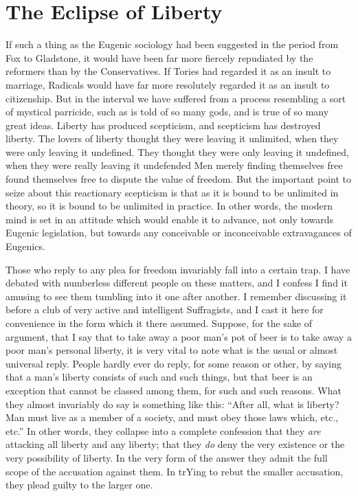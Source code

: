 \documentclass{book}
\begin{document}
\chapter{The Eclipse of Liberty}
\label{chapter-16}
If such a thing as the Eugenic sociology had been suggested in the period from Fox to Gladstone, it would have been far more fiercely repudiated by the reformers than by the Conservatives. If Tories had regarded it as an insult to marriage, Radicals would have far more resolutely regarded it as an insult to citizenship. But in the interval we have suffered from a process resembling a sort of mystical parricide, such as is told of so many gods, and is true of so many great ideas. Liberty has produced scepticism, and scepticism has destroyed liberty. The lovers of liberty thought they were leaving it unlimited, when they were only leaving it undefined. They thought they were only leaving it undefined, when they were really leaving it undefended Men merely finding themselves free found themselves free to dispute the value of freedom. But the important point to seize about this reactionary scepticism is that as it is bound to be unlimited in theory, so it is bound to be unlimited in practice. In other words, the modern mind is set in an attitude which would enable it to advance, not only towards Eugenic legislation, but towards any conceivable or inconceivable extravagances of Eugenics.

Those who reply to any plea for freedom invariably fall into a certain trap. I have debated with numberless different people on these matters, and I confess I find it amusing to see them tumbling into it one after another. I remember discussing it before a club of very active and intelligent Suffragists, and I cast it here for convenience in the form which it there assumed. Suppose, for the sake of argument, that I say that to take away a poor man’s pot of beer is to take away a poor man’s personal liberty, it is very vital to note what is the usual or almost universal reply. People hardly ever do reply, for some reason or other, by saying that a man’s liberty consists of such and such things, but that beer is an exception that cannot be classed among them, for such and such reasons. What they almost invariably do say is something like this: “After all, what is liberty? Man must live as a member of a society, and must obey those laws which, etc., etc.” In other words, they collapse into a complete confession that they \emph{are} attacking all liberty and any liberty; that they \emph{do} deny the very existence or the very possibility of liberty. In the very form of the answer they admit the full scope of the accusation against them. In trYing to rebut the smaller accusation, they plead guilty to the larger one.
\end{document}
